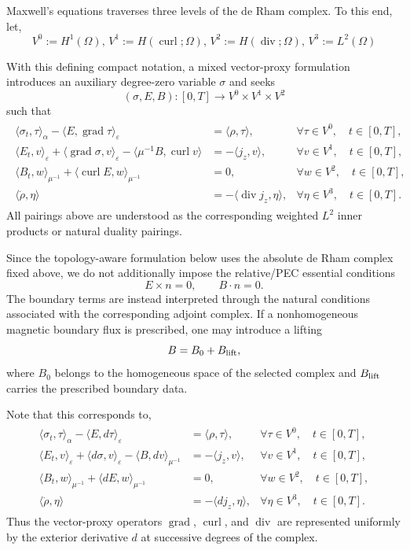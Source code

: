\documentclass{article}
\DeclareMathOperator{\grad}{grad}
\DeclareMathOperator{\curl}{curl}
\DeclareMathOperator{\divergence}{div}
\begin{document}
Maxwell's equations traverses three levels of the de Rham complex. To this end, let,
\[
V^0:=H^1(\Omega),\,V^1:=H(\curl;\Omega),\,V^2:=H(\divergence;\Omega),\,V^3:=L^2(\Omega)
\]

With this defining compact notation, a mixed vector-proxy formulation introduces an auxiliary
degree-zero variable $\sigma$ and seeks
\[
  (\sigma,E,B):[0,T]\to V^0\times V^1\times V^2
\]
such that
\begin{align}
\begin{array}{rll}
\langle \sigma_t,\tau\rangle_{\alpha}
-\langle E,\grad\tau\rangle_{\varepsilon}
&=\langle\rho,\tau\rangle,
&\forall\tau\in V^0,\quad t\in[0,T],
\\[1mm]
\langle E_t,v\rangle_{\varepsilon}
+\langle\grad\sigma,v\rangle_{\varepsilon}
-\langle\mu^{-1}B,\curl v\rangle
&=-\langle j_z,v\rangle,
&\forall v\in V^1,\quad t\in[0,T],
\\[1mm]
\langle B_t,w\rangle_{\mu^{-1}}
+\langle\curl E,w\rangle_{\mu^{-1}}
&=0,
&\forall w\in V^2,\quad t\in[0,T],
\\[1mm]
\langle\dot\rho,\eta\rangle
&=-\langle\divergence j_z,\eta\rangle,
&\forall\eta\in V^3,\quad t\in[0,T].
\end{array}
\end{align}
All pairings above are understood as the corresponding weighted
$L^2$ inner products or natural duality pairings.


Since the topology-aware formulation below uses the absolute de Rham
complex fixed above, we do not additionally impose the relative/PEC
essential conditions
\[
E\times n=0,
\qquad
B\cdot n=0.
\]
The boundary terms are instead interpreted through the natural
conditions associated with the corresponding adjoint complex. If a
nonhomogeneous magnetic boundary flux is prescribed, one may introduce
a lifting
\[
  B=B_0+B_{\rm lift},
\]
where $B_0$ belongs to the homogeneous space of the selected complex
and $B_{\rm lift}$ carries the prescribed boundary data.

Note that this corresponds to,
\begin{align*}
\begin{array}{rll}
\langle \sigma_t,\tau\rangle_{\alpha}
-\langle E,d\tau\rangle_{\varepsilon}
&=\langle\rho,\tau\rangle,
&\forall\tau\in V^0,\quad t\in[0,T],
\\[1mm]
\langle E_t,v\rangle_{\varepsilon}
+\langle d\sigma,v\rangle_{\varepsilon}
-\langle B,dv\rangle_{\mu^{-1}}
&=-\langle j_z,v\rangle,
&\forall v\in V^1,\quad t\in[0,T],
\\[1mm]
\langle B_t,w\rangle_{\mu^{-1}}
+\langle dE,w\rangle_{\mu^{-1}}
&=0,
&\forall w\in V^2,\quad t\in[0,T],
\\[1mm]
\langle\dot\rho,\eta\rangle
&=-\langle dj_z,\eta\rangle,
&\forall\eta\in V^3,\quad t\in[0,T].
\end{array}
\end{align*}
Thus the vector-proxy operators $\grad$, $\curl$, and $\divergence$
are represented uniformly by the exterior derivative $d$ at successive
degrees of the complex.
\end{document}
